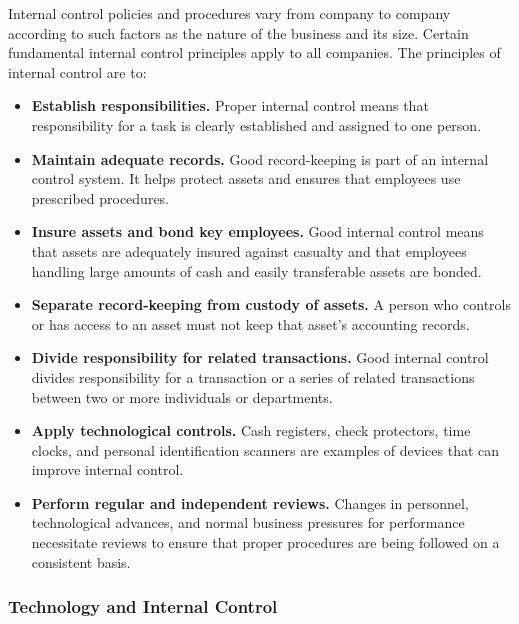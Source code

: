 \documentclass[../main.tex]{subfiles}
\begin{document}
	Internal control policies and procedures vary from company to company 
	according to such factors as the nature of the business and its size. 
	Certain fundamental internal control principles apply to all companies. The 
	principles of internal control are to:
	\begin{itemize}[noitemsep]
		\item \textbf{Establish responsibilities.} Proper internal control 
		means that responsibility for a task is clearly established and 
		assigned to one person.
		\item \textbf{Maintain adequate records.} Good record-keeping is part 
		of an internal control system. It helps protect assets and ensures that 
		employees use prescribed procedures.
		\item \textbf{Insure assets and bond key employees.} Good internal 
		control means 
		that assets are adequately insured against casualty and that employees 
		handling  large amounts of cash and easily transferable assets are 
		bonded.
		\item \textbf{Separate record-keeping from custody of assets.} A person 
		who controls or has access to an asset must not keep that asset’s 
		accounting records.
		\item \textbf{Divide responsibility for related transactions.} Good 
		internal control divides responsibility for a transaction or a series 
		of related transactions between two or more individuals or departments.
		\item \textbf{Apply technological controls.} Cash registers, check 
		protectors, time clocks, and personal identification scanners are 
		examples of devices that can improve internal control.
		\item \textbf{Perform regular and independent reviews.} Changes in 
		personnel, technological advances, and normal business pressures for 
		performance necessitate reviews to ensure that proper procedures are 
		being followed on a consistent basis.
	\end{itemize}

	\subsubsection{Technology and Internal Control}
	
\end{document}
